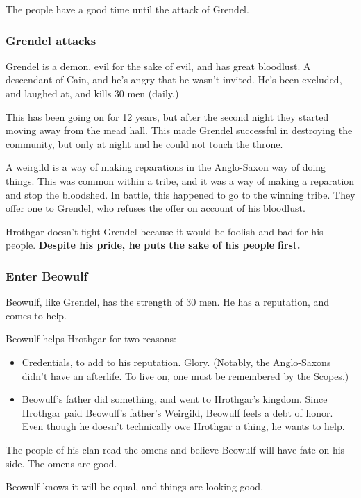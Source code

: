\documentclass[11pt]{article}
\begin{document}
The people have a good time until the attack of Grendel.  

\subsubsection{Grendel attacks}
\label{sec-1-1-3}
Grendel is a demon, evil for the sake of evil, and has great bloodlust. 
A descendant of Cain, and he's angry that he wasn't invited.  He's been
excluded, and laughed at, and kills 30 men (daily.)

This has been going on for 12 years, but after the second night they 
started moving away from the mead hall.  This made Grendel successful
in destroying the community, but only at night and he could not touch
the throne.

A weirgild is a way of making reparations in the Anglo-Saxon way of 
doing things.  This was common within a tribe, and it was a way of 
making a reparation and stop the bloodshed.  In battle, this happened
to go to the winning tribe.  They offer one to Grendel, who refuses
the offer on account of his bloodlust.

Hrothgar doesn't fight Grendel because it would be foolish and bad
for his people.  \textbf{Despite his pride, he puts the sake of his people}
\textbf{first.}

\subsubsection{Enter Beowulf}
\label{sec-1-1-4}
Beowulf, like Grendel, has the strength of 30 men.  He has a reputation,
and comes to help.

Beowulf helps Hrothgar for two reasons:
\begin{itemize}
\item Credentials, to add to his reputation.  Glory.
(Notably, the Anglo-Saxons didn't have an afterlife.  To live on, 
 one must be remembered by the Scopes.)
\item Beowulf's father did something, and went to Hrothgar's kingdom.  
Since Hrothgar paid Beowulf's father's Weirgild, Beowulf feels a 
debt of honor.  Even though he doesn't technically owe Hrothgar a
thing, he wants to help.
\end{itemize}

The people of his clan read the omens and believe Beowulf will have fate
on his side.  The omens are good.

Beowulf knows it will be equal, and things are looking good.
\end{document}
